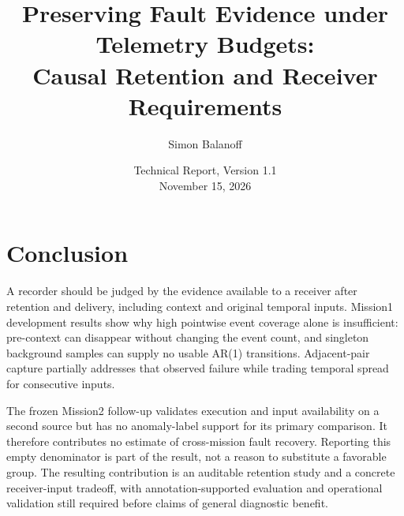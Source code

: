 \documentclass[11pt]{article}
\title{Preserving Fault Evidence under Telemetry Budgets:\\
Causal Retention and Receiver Requirements}
\author{Simon Balanoff}
\date{Technical Report, Version 1.1\\[0.25em]November 15, 2026}
\begin{document}
\maketitle










\section{Conclusion}
A recorder should be judged by the evidence available to a receiver after retention
and delivery, including context and original temporal inputs. Mission1 development
results show why high pointwise event coverage alone is insufficient: pre-context
can disappear without changing the event count, and singleton background samples
can supply no usable AR(1) transitions. Adjacent-pair capture partially addresses
that observed failure while trading temporal spread for consecutive inputs.

The frozen Mission2 follow-up validates execution and input availability on a
second source but has no anomaly-label support for its primary comparison. It
therefore contributes no estimate of cross-mission fault recovery. Reporting this
empty denominator is part of the result, not a reason to substitute a favorable
group. The resulting contribution is an auditable retention study and a concrete
receiver-input tradeoff, with annotation-supported evaluation and operational
validation still required before claims of general diagnostic benefit.



\clearpage
\appendix

\clearpage

\end{document}
